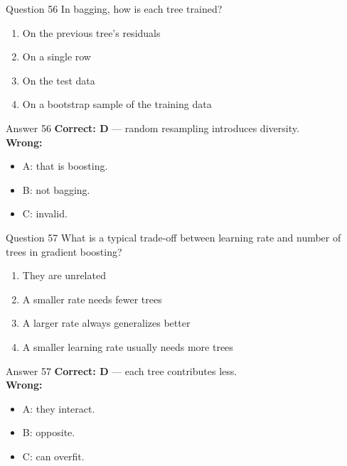 \documentclass[aspectratio=169,11pt]{beamer}
\begin{document}
\begin{frame}{Question 56}
In bagging, how is each tree trained?
\begin{enumerate}[label=\Alph*.]
\item On the previous tree's residuals
\item On a single row
\item On the test data
\item On a bootstrap sample of the training data
\end{enumerate}
\end{frame}
\begin{frame}{Answer 56}
\textbf{Correct: D} --- random resampling introduces diversity.\\
\vspace{0.5em}
\textbf{Wrong:}
\begin{itemize}
\item A: that is boosting.
\item B: not bagging.
\item C: invalid.
\end{itemize}
\end{frame}

\begin{frame}{Question 57}
What is a typical trade-off between learning rate and number of trees in gradient boosting?
\begin{enumerate}[label=\Alph*.]
\item They are unrelated
\item A smaller rate needs fewer trees
\item A larger rate always generalizes better
\item A smaller learning rate usually needs more trees
\end{enumerate}
\end{frame}
\begin{frame}{Answer 57}
\textbf{Correct: D} --- each tree contributes less.\\
\vspace{0.5em}
\textbf{Wrong:}
\begin{itemize}
\item A: they interact.
\item B: opposite.
\item C: can overfit.
\end{itemize}
\end{frame}
\end{document}
